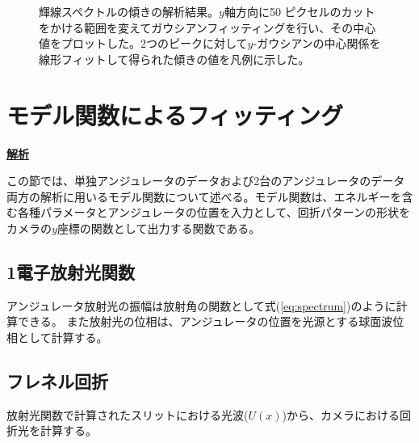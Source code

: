 \documentclass[a4paper,11pt,uplatex]{jsbook}
\begin{document}
\begin{figure}[h]
\begin{subfigure}[h]{0.45\linewidth}
  \end{subfigure}
  \caption[水銀灯の波長較正-3]{輝線スペクトルの傾きの解析結果。$y$軸方向に50 ピクセルのカットをかける範囲を変えてガウシアンフィッティングを行い、その中心値をプロットした。2つのピークに対して$y$-ガウシアンの中心関係を線形フィットして得られた傾きの値を凡例に示した。}\label{tiltfit}
\end{figure}

\section{モデル関数によるフィッティング}
\noindent \textbf{\underline{解析}}\par
この節では、単独アンジュレータのデータおよび2台のアンジュレータのデータ両方の解析に用いるモデル関数について述べる。モデル関数は、エネルギーを含む各種パラメータとアンジュレータの位置を入力として、回折パターンの形状をカメラの$y$座標の関数として出力する関数である。
\subsection{1電子放射光関数}
アンジュレータ放射光の振幅は放射角の関数として式(\ref{eq:spectrum})のように計算できる。
また放射光の位相は、アンジュレータの位置を光源とする球面波位相として計算する。
\subsection{フレネル回折}
放射光関数で計算されたスリットにおける光波($U(x)$)から、カメラにおける回折光を計算する。
\end{document}
